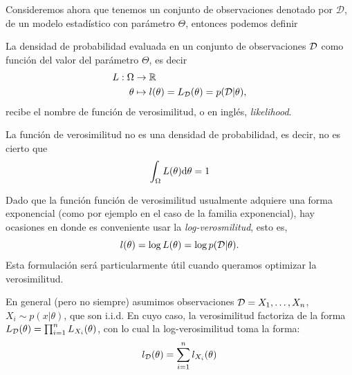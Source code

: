 Consideremos ahora que tenemos un conjunto de observaciones denotado por $\mathcal{D}$, de un modelo estadístico con parámetro $\Theta$, entonces podemos definir

\begin{definition}
La densidad de probabilidad evaluada en un conjunto de observaciones ${\mathcal D}$ como función del valor del parámetro $\Theta$, es decir 
\begin{align}
    L: \Omega &\rightarrow {\mathbb R}\\
    \theta&\mapsto l(\theta) = L_{\mathcal D}(\theta) = p({\mathcal D}|\theta),
\end{align}
recibe el nombre de función de verosimilitud, o en inglés, \emph{likelihood}. 
\label{función_verosimilitud}
\end{definition}
\begin{remark}
La función de verosimilitud no es una densidad de probabilidad, es decir, no es cierto que
\begin{equation}
    \int_\Omega L(\theta){\text{d}}\theta = 1
\end{equation}
\end{remark}

\begin{remark}
Dado que la función función de verosimilitud usualmente adquiere una forma exponencial (como por ejemplo en el caso de la familia exponencial), hay ocasiones en donde es conveniente usar la \emph{log-verosmilitud}, esto es, 
\begin{equation}
l(\theta)=\log L(\theta)=\log p({\mathcal D}|\theta).
\end{equation}
Esta formulación será particularmente útil cuando queramos optimizar la verosimilitud. 
\end{remark}

\begin{remark}
En general (pero no siempre) asumimos observaciones ${\mathcal D} = {X_1,\ldots,X_n}$, $X_i\sim p(x|\theta)$, que son i.i.d. En cuyo caso, la verosimilitud factoriza de la forma $L_{\mathcal D}(\theta) = \prod_{i=1}^n L_{X_i}(\theta)$, con lo cual la log-verosimilitud toma la forma: 
\begin{equation}
l_{\mathcal D}(\theta) = \sum_{i=1}^nl_{X_i}(\theta)
\end{equation}
\end{remark}

